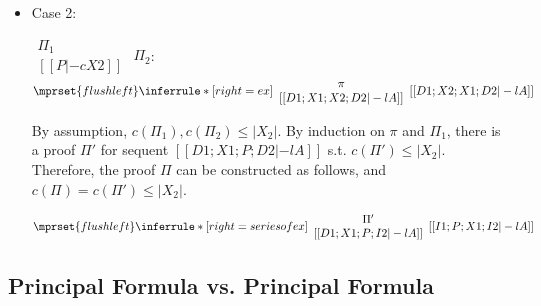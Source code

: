 \begin{itemize}
\item Case 2:
      \begin{center}
        \scriptsize
        \begin{math}
          \begin{array}{c}
            \Pi_1 \\
            {[[P |-c X2]]}
          \end{array}
        \end{math}
        \qquad\qquad
        $\Pi_2$:
        \begin{math}
          $$\mprset{flushleft}
          \inferrule* [right={\tiny ex}] {
            {
              \begin{array}{c}
                \pi \\
                {[[D1; X1; X2; D2 |-l A]]}
              \end{array}
            }
          }{[[D1; X2; X1; D2 |-l A]]}
        \end{math}
      \end{center}
      By assumption, $c(\Pi_1),c(\Pi_2)\leq |X_2|$. By induction on $\pi$
      and $\Pi_1$, there is a proof $\Pi'$ for sequent
      $[[D1; X1; P; D2 |-l A]]$ s.t. $c(\Pi')\leq|X_2|$. Therefore, the
      proof $\Pi$ can be constructed as follows, and
      $c(\Pi)=c(\Pi')\leq|X_2|$.
      \begin{center}
        \scriptsize
        \begin{math}
          $$\mprset{flushleft}
          \inferrule* [right={\tiny series of ex}] {
            {
              \begin{array}{c}
                \Pi' \\
                {[[D1; X1; P; I2 |-l A]]}
              \end{array}
            }
          }{[[I1; P; X1; I2 |-l A]]}
        \end{math}
      \end{center}
\end{itemize}



\subsection{Principal Formula vs. Principal Formula} 

